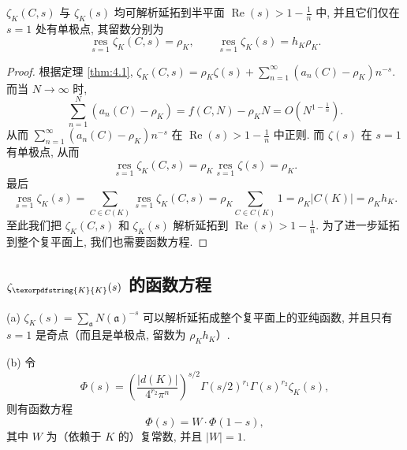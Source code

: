 \begin{theorem}\label{thm:4.14}
$\zeta_K(C,s)$ 与 $\zeta_K(s)$ 均可解析延拓到半平面 $\operatorname{Re}(s)>1-\frac{1}{n}$ 中, 并且它们仅在 $s=1$ 处有单极点, 其留数分别为
\[
  \underset{s=1}{\operatorname{res}}\zeta_K(C,s)=\rho_K,\qquad
  \underset{s=1}{\operatorname{res}}\zeta_K(s)=h_K\rho_K.
\]
\end{theorem}

\begin{proof}
根据定理 \ref{thm:4.1}, $\zeta_K(C,s)=\rho_K\zeta(s)+\sum_{n=1}^{\infty}(a_n(C)-\rho_K)n^{-s}$. 而当 $N\to\infty$ 时, 
\[
  \sum_{n=1}^{N}(a_n(C)-\rho_K)=f(C,N)-\rho_KN=O\left(N^{1-\frac{1}{n}}\right).
\]
从而 $\sum_{n=1}^{\infty}(a_n(C)-\rho_K)n^{-s}$ 在 $\operatorname{Re}(s)>1-\frac{1}{n}$ 中正则. 而 $\zeta(s)$ 在 $s=1$ 有单极点, 从而
\[
  \underset{s=1}{\operatorname{res}}\zeta_K(C,s)=\rho_K\underset{s=1}{\operatorname{res}}\zeta(s)=\rho_K.
\]
最后
\[
  \underset{s=1}{\operatorname{res}}\zeta_K(s)=\sum_{C\in C(K)}\underset{s=1}{\operatorname{res}}\zeta_K(C,s)
  =\rho_K\sum_{C\in C(K)}1=\rho_K|C(K)|=\rho_Kh_K.
\]
至此我们把 $\zeta_K(C,s)$ 和 $\zeta_K(s)$ 解析延拓到 $\operatorname{Re}(s)>1-\frac{1}{n}$. 为了进一步延拓到整个复平面上, 我们也需要函数方程. 
\end{proof}

\subsection{\texorpdfstring{$\zeta_{\texorpdfstring{K}{K}}(s)$}{zetaK(s)} 的函数方程}\label{sec:ch4-s3-2}

\begin{theorem}\label{thm:4.15}
(a) $\zeta_K(s)=\sum_{\mathfrak{a}}N(\mathfrak{a})^{-s}$ 可以解析延拓成整个复平面上的亚纯函数, 并且只有 $s=1$ 是奇点（而且是单极点, 留数为 $\rho_Kh_K$）. 

(b) 令
\[
  \Phi(s)=\left(\frac{|d(K)|}{4^{r_2}\pi^n}\right)^{s/2}\Gamma(s/2)^{r_1}\Gamma(s)^{r_2}\zeta_K(s),
\]
则有函数方程
\[
  \Phi(s)=W\cdot\Phi(1-s),
\]
其中 $W$ 为（依赖于 $K$ 的）复常数, 并且 $|W|=1$. 
\end{theorem}

